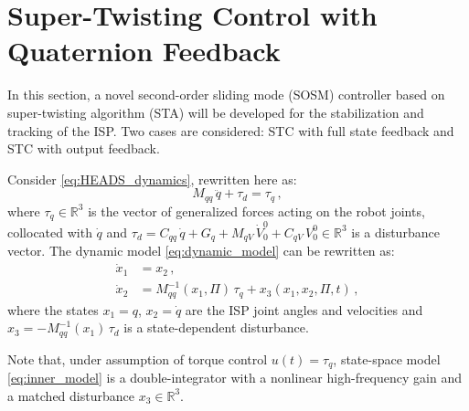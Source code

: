 \section{Super-Twisting Control with Quaternion Feedback}
\label{sec:control}

In this section, a novel second-order sliding mode (SOSM) controller based on super-twisting algorithm (STA) will be developed for the stabilization and tracking of the ISP.
%
Two cases are considered: STC with full state feedback and STC with output feedback.

Consider \eqref{eq:HEADS_dynamics}, rewritten here as:
%
\begin{equation}
M_{qq} \, \ddot{q} + \tau_d = \tau_q \,,
\label{eq:dynamic_model}
\end{equation}
%
where $\tau_q \in \mathbb{R}^{3}$ is the vector of generalized forces acting on the robot joints, collocated with $\dot{q}$ and $\tau_d = C_{qq} \, \dot{q} + G_{q} + M_{qV} \, \dot{V}^{0}_{0} + C_{qV} \, V^{0}_{0} \in \mathbb{R}^{3}$ is a disturbance vector.
%
%
The dynamic model \eqref{eq:dynamic_model} can be rewritten as:
%
\begin{align}
\dot{x}_1 &= x_2 \,, \nonumber \\
\dot{x}_2 &= M^{-1}_{qq}(x_1,\Pi)\,\tau_q + x_3(x_1,x_2,\Pi,t) \,,
\label{eq:inner_model}
\end{align}
%
where the states $x_1 = q$, $x_2 = \dot{q}$ are the ISP joint angles and velocities and $x_3 = -M^{-1}_{qq}(x_1) \,\tau_d$ is a state-dependent disturbance.

\begin{remark}
Note that, under assumption of torque control $u(t) = \tau_q$, state-space model \eqref{eq:inner_model} is a double-integrator with a nonlinear high-frequency gain and a matched disturbance $x_3 \in \mathbb{R}^{3}$.
\end{remark}

